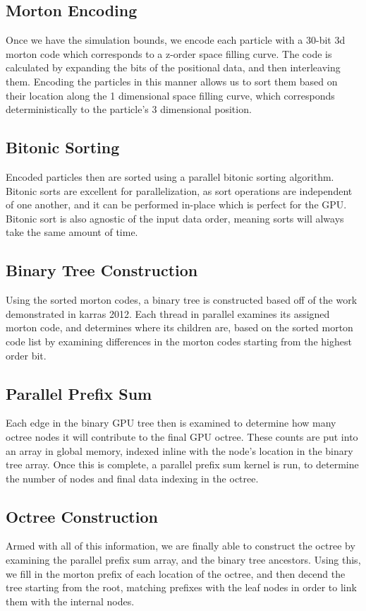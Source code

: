 \documentclass[fleqn,10pt]{SelfArx} %
\begin{document}
\subsection{Morton Encoding}
Once we have the simulation bounds, we encode each particle with a 30-bit 3d morton code which corresponds to a z-order space filling curve. The code is calculated by expanding the bits of the positional data, and then interleaving them. Encoding the particles in this manner allows us to sort them based on their location along the 1 dimensional space filling curve, which corresponds deterministically to the particle’s 3 dimensional position.

\subsection{Bitonic Sorting}
Encoded particles then are sorted using a parallel bitonic sorting algorithm. Bitonic sorts are excellent for parallelization, as sort operations are independent of one another, and it can be performed in-place which is perfect for the GPU. Bitonic sort is also agnostic of the input data order, meaning sorts will always take the same amount of time.

\subsection{Binary Tree Construction}
Using the sorted morton codes, a binary tree is constructed based off of the work demonstrated in karras 2012. Each thread in parallel examines its assigned morton code, and determines where its children are, based on the sorted morton code list by examining differences in the morton codes starting from the highest order bit.

\subsection{Parallel Prefix Sum}
Each edge in the binary GPU tree then is examined to determine how many octree nodes it will contribute to the final GPU octree. These counts are put into an array in global memory, indexed inline with the node’s location in the binary tree array. Once this is complete, a parallel prefix sum kernel is run, to determine the number of nodes and final data indexing in the octree. 

\subsection{Octree Construction}
Armed with all of this information, we are finally able to construct the octree by examining the parallel prefix sum array, and the binary tree ancestors. Using this, we fill in the morton prefix of each location of the octree, and then decend the tree starting from the root, matching prefixes with the leaf nodes in order to link them with the internal nodes.
\end{document}
